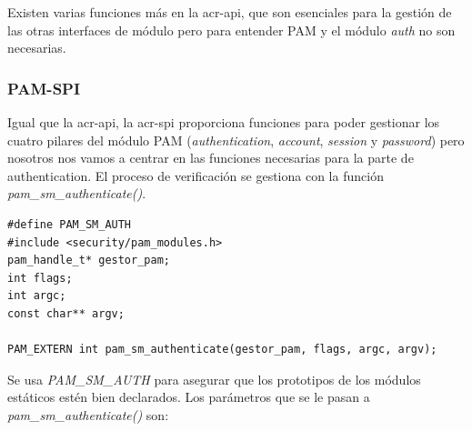 \documentclass[titlepage, 12pt, a4paper]{article}
\begin{document}
Existen varias funciones más en la \gls{acr-api}, que son esenciales para la gestión de las otras interfaces de módulo pero para entender PAM y el módulo \textit{auth} no son necesarias.
\subsubsection{PAM-SPI}
Igual que la \gls{acr-api}, la \gls{acr-spi} proporciona funciones para poder gestionar los cuatro pilares del módulo PAM (\textit{authentication}, \textit{account}, \textit{session} y \textit{password}) pero nosotros nos vamos a centrar en las funciones necesarias para la parte de \gls{authentication}. El proceso de verificación se gestiona con la función \textit{pam\_sm\_authenticate()}.
\begin{lstlisting}
#define PAM_SM_AUTH
#include <security/pam_modules.h>
pam_handle_t* gestor_pam;
int flags;
int argc;
const char** argv;

PAM_EXTERN int pam_sm_authenticate(gestor_pam, flags, argc, argv);
\end{lstlisting}
Se usa \textit{PAM\_SM\_AUTH} para asegurar que los prototipos de los módulos estáticos estén bien declarados.
Los parámetros que se le pasan a \textit{pam\_sm\_authenticate()} son: 
\end{document}
